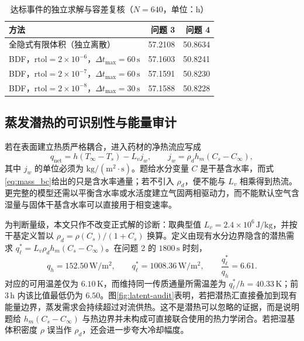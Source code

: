 \documentclass[UTF8,a4paper,zihao=-4,fontset=fandol]{ctexart}
\newcommand{\unit}[1]{\,\mathrm{#1}}
\begin{document}
\begin{table}[H]
\centering
\caption{达标事件的独立求解与容差复核（$N=640$，单位：$\mathrm{h}$）}
\label{tab:eventaudit}
\small
\begin{tabular}{lrr}
\toprule
方法 & 问题 3 & 问题 4 \\
\midrule
全隐式有限体积（独立离散） & 57.2108 & 50.8634 \\
BDF，$\mathrm{rtol}=2\times10^{-6}$，$\Delta t_{\max}=60\unit{s}$ & 57.1603 & 50.8241 \\
BDF，$\mathrm{rtol}=2\times10^{-7}$，$\Delta t_{\max}=60\unit{s}$ & 57.1591 & 50.8230 \\
BDF，$\mathrm{rtol}=2\times10^{-8}$，$\Delta t_{\max}=30\unit{s}$ & 57.1588 & 50.8228 \\
\bottomrule
\end{tabular}
\end{table}

\subsection{蒸发潜热的可识别性与能量审计}

若在表面建立热质严格耦合，进入药材的净热流应写成
\begin{equation}
q_{\mathrm{net}}=h(T_\infty-T_s)-L_vj_w,
\qquad
j_w=\rho_dh_m(C_s-C_\infty),
\label{eq:latent_boundary}
\end{equation}
其中 $j_w$ 的单位必须为 $\mathrm{kg/(m^2\cdot s)}$。题给水分变量 $C$ 是干基含水率，而式\eqref{eq:mass_bc}给出的只是含水率通量；若不引入 $\rho_d$，便不能与 $L_v$ 相乘得到热流。更完整的模型还需以平衡含水率或水活度建立气固两相驱动力，而不能默认空气含湿量与固体干基含水率可以直接用于相变速率。

为判断量级，本文只作不改变正式解的诊断：取典型值 $L_v=2.4\times10^6\unit{J/kg}$，并按干基定义暂以 $\rho_d=\rho(C_s)/(1+C_s)$ 换算。定义由现有水分边界隐含的潜热需求 $q_\ell^*=L_v\rho_dh_m(C_s-C_\infty)$。在问题 2 的 $1800\unit{s}$ 时刻，
\begin{equation}
q_h=152.50\unit{W/m^2},\qquad
q_\ell^*=1008.36\unit{W/m^2},\qquad
\frac{q_\ell^*}{q_h}=6.61.
\end{equation}
对应的可用温差仅为 $6.10\unit{K}$，而维持同一传质通量所需温差为 $q_\ell^*/h=40.33\unit{K}$；前 $3\unit{h}$ 内该比值最低仍为 $6.50$。图\ref{fig:latent-audit}表明，若把潜热汇直接叠加到现有能量边界，蒸发需求会持续超过对流供热。这不是潜热可以忽略的证据，而是说明题给 $h_m(C_s-C_\infty)$ 与热边界并未构成可直接联合使用的热力学闭合。若把湿基体积密度 $\rho$ 误当作 $\rho_d$，还会进一步夸大冷却幅度。
\end{document}

